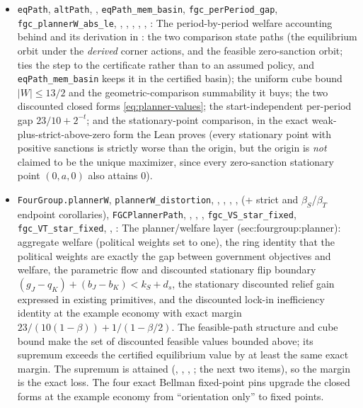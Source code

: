 \begin{itemize}[leftmargin=1.4em,itemsep=1pt]
\item \texttt{eqPath}, \texttt{altPath}, , \texttt{eqPath\_mem\_basin}, \texttt{fgc\_perPeriod\_gap}, \texttt{fgc\_plannerW\_abs\_le}, , , , , , : The period-by-period welfare accounting behind  and its derivation in : the two comparison state paths (the equilibrium orbit under the \emph{derived} corner actions, and the feasible zero-sanction orbit;  ties the step to the certificate rather than to an assumed policy, and \texttt{eqPath\_mem\_basin} keeps it in the certified basin); the uniform cube bound $|W|\le 13/2$ and the geometric-comparison summability it buys; the two discounted closed forms \eqref{eq:planner-values}; the start-independent per-period gap $23/10 + 2^{-t}$; and the stationary-point comparison, in the exact weak-plus-strict-above-zero form the Lean proves (every stationary point with positive sanctions is strictly worse than the origin, but the origin is \emph{not} claimed to be the unique maximizer, since every zero-sanction stationary point $(0,a,0)$ also attains $0$).
\item \texttt{FourGroup.plannerW}, \texttt{plannerW\_distortion}, , , , ,  (+ strict and $\beta_S$/$\beta_T$ endpoint corollaries), \texttt{FGCPlannerPath}, , , , \texttt{fgc\_VS\_star\_fixed}, \texttt{fgc\_VT\_star\_fixed}, , : The planner/welfare layer (sec:fourgroup:planner): aggregate welfare (political weights set to one), the ring identity that the political weights are exactly the gap between government objectives and welfare, the parametric flow and discounted stationary flip boundary $(g_J-q_K)+(b_J-b_K) < k_S+d_s$, the stationary discounted relief gain expressed in existing primitives, and the discounted lock-in inefficiency identity at the example economy with exact margin $23/(10(1-\beta))+1/(1-\beta/2)$. The feasible-path structure and cube bound make the set of discounted feasible values bounded above; its supremum exceeds the certified equilibrium value by at least the same exact margin. The supremum is attained (, , , ; the next two items), so the margin is the exact loss. The four exact Bellman fixed-point pins upgrade the closed forms at the example economy from ``orientation only'' to fixed points.

\end{itemize}
